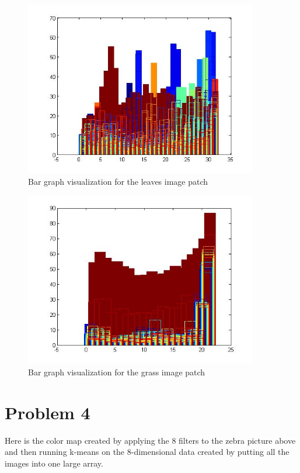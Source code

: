 \documentclass[11pt,psfig]{article}
\begin{document}
\begin{figure}[H]
\centering
\includegraphics[height=3in]{prob3patch2bar.jpg}
\caption{Bar graph visualization for the leaves image patch}
\end{figure}

\begin{figure}[H]
\centering
\includegraphics[height=3in]{prob3patch3bar.jpg}
\caption{Bar graph visualization for the grass image patch}
\end{figure}

\newpage

\section*{Problem 4}

Here is the color map created by applying the 8 filters to the zebra picture above and then running k-means on the 8-dimensional data created by putting all the images into one large array. 
\end{document}
